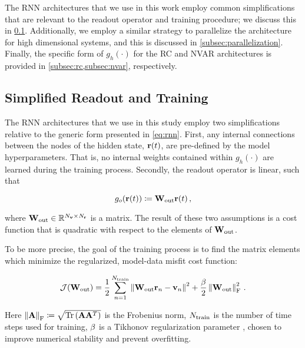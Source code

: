 The RNN architectures that we use in this work employ common
simplifications that are relevant to the readout operator and training
procedure; we discuss this in \cref{subsec:readout}.
Additionally, we employ a similar strategy to parallelize the architecture for
high dimensional systems, and this is discussed in
\cref{subsec:parallelization}.
Finally, the specific form of $g_h(\cdot)$ for the RC and NVAR architectures
is provided in \cref{subsec:rc,subsec:nvar},
respectively.


\subsection{Simplified Readout and Training}
\label{subsec:readout}

The RNN architectures that we use in this study employ two
simplifications relative to the generic form presented in
\cref{eq:rnn}.
First, any internal connections between the nodes of the hidden state,
$\mathbf{r}(t)$, are pre-defined by the model hyperparameters.
That is, no internal weights contained within $g_h(\cdot)$
are learned during the training process.
Secondly, the readout operator is linear, such that
\begin{linenomath*}\begin{equation*}
    g_o(\mathbf{r}(t)) \coloneqq \mathbf{W}_\text{out} \mathbf{r}(t) \, ,
\end{equation*}\end{linenomath*}
where $\mathbf{W}_\text{out} \in \mathbb{R}^{N_{\mathbf{v}}\times N_{\mathbf{r}}}$ is a matrix.
The result of these two assumptions is a cost function that is quadratic with
respect to the elements of $\mathbf{W}_\text{out}$.

To be more precise, the goal of the training process is to find the matrix
elements which minimize the regularized, model-data misfit cost function:
\begin{linenomath*}\begin{equation}
    \mathcal{J}(\mathbf{W}_\text{out}) =
        \dfrac{1}{2}\sum_{n=1}^{N_\text{train}} \left\lVert\mathbf{W}_\text{out} \mathbf{r}_n - \mathbf{v}_n\right\rVert^2
        +
        \dfrac{\beta}{2}\left\lVert\mathbf{W}_\text{out}\right\rVert_\text{F}^2 \, .
    \label{eq:cost}
\end{equation}\end{linenomath*}
Here
$\left\lVert\mathbf{A}\right\rVert_\text{F} \coloneqq
\sqrt{\text{Tr}\left(\mathbf{A}\mathbf{A}^T\right)}$
is the Frobenius norm,
$N_\text{train}$ is the number of time steps used for training,
$\beta$ is a Tikhonov regularization parameter \citep{tikhonov_solution_1963}, chosen to improve
numerical stability and prevent overfitting.

